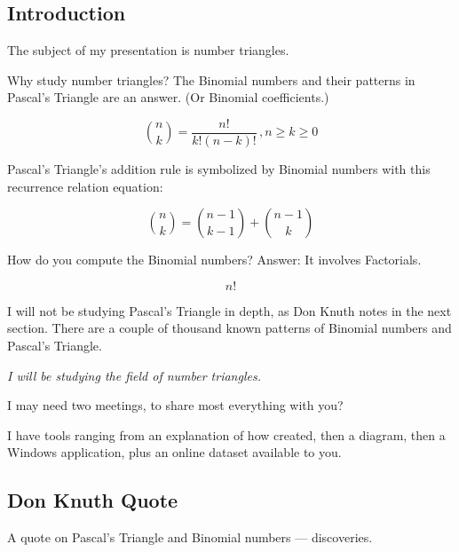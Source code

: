 \documentclass[12pt]{article}
\begin{document}
    \subsection{Introduction}
    \label{sec:11}

    The subject of my presentation is number triangles.

    Why study number triangles? The Binomial numbers and their patterns in Pascal's 
    Triangle\cite{.2013} are an answer. (Or Binomial coefficients.)\cite{Gellert.19771975}
    
    \begin{equation}
        \label{eq1:i1}
        \binom{n}{k} = \frac{{n!}}{{k!(n - k)!}}\, ,n \geqslant k \geqslant 0
    \end{equation}
    
    Pascal's Triangle's addition rule is symbolized by Binomial numbers with this recurrence 
    relation equation:
    
    \begin{equation}
        \label{eq1:i2}
        \binom{n}{k} = \binom{n-1}{k-1} + \binom{n-1}{k}
    \end{equation}
    
    How do you compute the Binomial numbers? Answer: It involves Factorials.
    
    \begin{equation}
        \label{eq1:i3}
        n!
    \end{equation}
    
    I will not be studying Pascal's Triangle in depth, as Don Knuth notes in the next section. 
    There are a couple of thousand known patterns of Binomial numbers and Pascal's Triangle.
    
    \textit{I will be studying the field of number triangles.}
    
    I may need two meetings, to share most everything with you?
    
    I have tools ranging from an explanation of how created, then a diagram, then a Windows 
    application, plus an online dataset available to you.

     
    \subsection{Don Knuth Quote}
    \label{sec:12}

    A quote on Pascal's Triangle and Binomial numbers --- discoveries.
    
\end{document}
